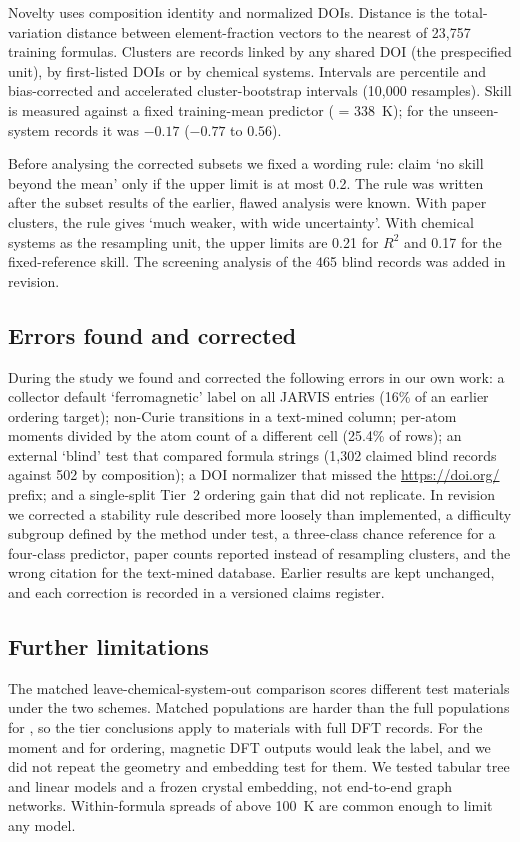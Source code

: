 \documentclass[11pt,a4paper]{article}
\begin{document}
Novelty uses composition identity and normalized DOIs. Distance is the total-variation distance between element-fraction vectors to the nearest of 23,757 training formulas. Clusters are records linked by any shared DOI (the prespecified unit), by first-listed DOIs or by chemical systems. Intervals are percentile and bias-corrected and accelerated cluster-bootstrap intervals (10,000 resamples). Skill is measured against a fixed training-mean predictor (\Tc{} = 338~K); for the unseen-system records it was $-0.17$ ($-0.77$ to $0.56$).

Before analysing the corrected subsets we fixed a wording rule: claim `no skill beyond the mean' only if the upper limit is at most 0.2. The rule was written after the subset results of the earlier, flawed analysis were known. With paper clusters, the rule gives `much weaker, with wide uncertainty'. With chemical systems as the resampling unit, the upper limits are 0.21 for $R^2$ and 0.17 for the fixed-reference skill. The screening analysis of the 465 blind records was added in revision.

\subsection*{Errors found and corrected}
During the study we found and corrected the following errors in our own work: a collector default `ferromagnetic' label on all JARVIS entries (16\% of an earlier ordering target); non-Curie transitions in a text-mined \Tc{} column; per-atom moments divided by the atom count of a different cell (25.4\% of rows); an external `blind' test that compared formula strings (1,302 claimed blind records against 502 by composition); a DOI normalizer that missed the \url{https://doi.org/} prefix; and a single-split Tier~2 ordering gain that did not replicate. In revision we corrected a stability rule described more loosely than implemented, a difficulty subgroup defined by the method under test, a three-class chance reference for a four-class predictor, paper counts reported instead of resampling clusters, and the wrong citation for the text-mined database. Earlier results are kept unchanged, and each correction is recorded in a versioned claims register.

\subsection*{Further limitations}
The matched leave-chemical-system-out comparison scores different test materials under the two schemes. Matched populations are harder than the full populations for \Tc{}, so the tier conclusions apply to materials with full DFT records. For the moment and for ordering, magnetic DFT outputs would leak the label, and we did not repeat the geometry and embedding test for them. We tested tabular tree and linear models and a frozen crystal embedding, not end-to-end graph networks. Within-formula spreads of \Tc{} above 100~K are common enough to limit any \Tc{} model.
\end{document}

